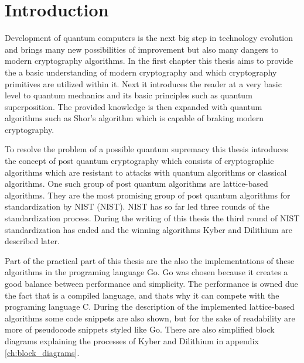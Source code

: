 \chapter*{Introduction}
{}

Development of quantum computers is the next big step in technology evolution and brings many new possibilities of improvement but also many dangers to modern cryptography algorithms. In the first chapter this thesis aims to provide the a basic understanding of modern cryptography and which cryptography primitives are utilized within it. Next it introduces the reader at a very basic level to quantum mechanics and its basic principles such as quantum superposition. The provided knowledge is then expanded with quantum algorithms such as Shor's algorithm which is capable of braking modern cryptography.

To resolve the problem of a possible quantum supremacy this thesis introduces the concept of post quantum cryptography which consists of cryptographic algorithms which are resistant to attacks with quantum algorithms or classical algorithms. One such group of post quantum algorithms are lattice-based algorithms. They are the most promising group of post quantum algorithms for standardization by NIST (\acl{NIST}). NIST has so far led three rounds of the standardization process. During the writing of this thesis the third round of NIST standardization has ended and the winning algorithms Kyber and Dilithium are described later.

Part of the practical part of this thesis are the also the implementations of these algorithms in the programing language Go. Go was chosen because it creates a good balance between performance and simplicity. The performance is owned due the fact that is a compiled language, and thats why it can compete with the programing language C. During the description of the implemented lattice-based algorithms some code snippets are also shown, but for the sake of readability are more of pseudocode snippets styled like Go. There are also simplified block diagrams explaining the processes of Kyber and Dilithium in appendix \ref{ch:block_diagrams}.
